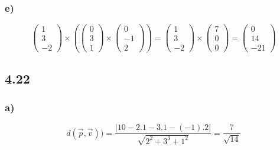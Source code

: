 \documentclass[11pt]{article}
\begin{document}
\subsubsection*{e)}
\[
\begin{pmatrix}
1\\3\\-2
\end{pmatrix}
\times
\left(
\begin{pmatrix}
0\\3\\1
\end{pmatrix}
\times
\begin{pmatrix}
0\\-1\\2
\end{pmatrix}
\right)
=
\begin{pmatrix}
1\\3\\-2
\end{pmatrix}
\times
\begin{pmatrix}
7\\0\\0
\end{pmatrix}
=
\begin{pmatrix}
0\\14\\-21
\end{pmatrix}
\]

\subsection*{4.22}
\subsubsection*{a)}
\[
d(\vec{p},\vec{v})) = \frac{|10-2.1-3.1-(-1).2|}{\sqrt{2^2 + 3^3 + 1^2}} = \frac{7}{\sqrt{14}}
\]
\end{document}
